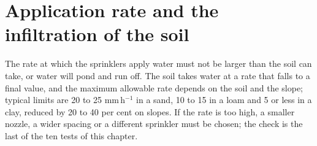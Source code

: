 \section{Application rate and the infiltration of the soil}
The rate at which the sprinklers apply water must not be larger than the soil can take, or water will pond and run off. The soil takes water at a rate that falls to a final value, and the maximum allowable rate depends on the soil and the slope; typical limits are 20 to 25 mm\,h$^{-1}$ in a sand, 10 to 15 in a loam and 5 or less in a clay, reduced by 20 to 40 per cent on slopes. If the rate is too high, a smaller nozzle, a wider spacing or a different sprinkler must be chosen; the check is the last of the ten tests of this chapter.

